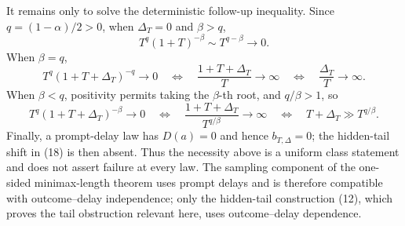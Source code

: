 It remains only to solve the deterministic follow-up inequality.  Since \(q=(1-\alpha)/2>0\), when \(\Delta_T=0\) and \(\beta>q\),
\[
 T^q(1+T)^{-\beta}\sim T^{q-\beta}\longrightarrow0.
 \tag{21}
\]
When \(\beta=q\),
\[
 T^q(1+T+\Delta_T)^{-q}\longrightarrow0
 \quad\Longleftrightarrow\quad
 \frac{1+T+\Delta_T}{T}\longrightarrow\infty
 \quad\Longleftrightarrow\quad
 \frac{\Delta_T}{T}\longrightarrow\infty.
 \tag{22}
\]
When \(\beta<q\), positivity permits taking the \(\beta\)-th root, and \(q/\beta>1\), so
\[
 T^q(1+T+\Delta_T)^{-\beta}\longrightarrow0
 \quad\Longleftrightarrow\quad
 \frac{1+T+\Delta_T}{T^{q/\beta}}\longrightarrow\infty
 \quad\Longleftrightarrow\quad
 T+\Delta_T\gg T^{q/\beta}.
 \tag{23}
\]
Finally, a prompt-delay law has \(D(a)=0\) and hence \(b_{T,\Delta}=0\); the hidden-tail shift in (18) is then absent.  Thus the necessity above is a uniform class statement and does not assert failure at every law.  The sampling component of the one-sided minimax-length theorem uses prompt delays and is therefore compatible with outcome--delay independence; only the hidden-tail construction (12), which proves the tail obstruction relevant here, uses outcome--delay dependence.
